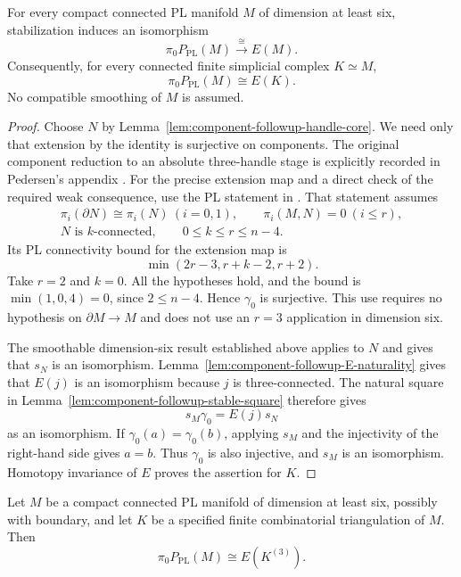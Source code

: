 \begin{theorem}\label{thm:component-followup-all-PL-six}
For every compact connected PL manifold $M$ of dimension at least six,
stabilization induces an isomorphism
\[
                      \pi_0P_{\mathrm{PL}}(M)\xrightarrow{\ \cong\ }E(M).
\]
Consequently, for every connected finite simplicial complex $K\simeq M$,
\[
                             \pi_0P_{\mathrm{PL}}(M)\cong E(K).
\]
No compatible smoothing of $M$ is assumed.
\end{theorem}

\begin{proof}
Choose $N$ by Lemma~\ref{lem:component-followup-handle-core}.
We need only that extension by the identity is surjective on
components.  The original component reduction to an absolute
three-handle stage is explicitly recorded in Pedersen's appendix
\cite[\S2, pp.~148--149]{Pedersen1975ComponentAppendix}.
For the precise extension map and a direct check of the required
weak consequence, use the PL statement in
\cite[Theorem~3.3 and the preceding paragraph,
p.~17]{GalvinNonino2025v1Component}.
That statement assumes
\[
 \begin{gathered}
 \pi_i(\partial N)\cong\pi_i(N)\ (i=0,1),\qquad
 \pi_i(M,N)=0\ (i\leq r),\\
 N\text{ is }k\text{-connected},\qquad 0\leq k\leq r\leq n-4.
 \end{gathered}
\]
Its PL connectivity bound for the extension map is
\[
                              \min(2r-3,r+k-2,r+2).
\]
Take $r=2$ and $k=0$.  All the hypotheses hold, and the bound is
$\min(1,0,4)=0$, since $2\leq n-4$.  Hence $\gamma_0$ is surjective.
This use requires no hypothesis on $\partial M\to M$ and does not use
an $r=3$ application in dimension six.

The smoothable dimension-six result established above applies to
$N$ and gives that $s_N$ is an isomorphism.
Lemma~\ref{lem:component-followup-E-naturality} gives that $E(j)$ is
an isomorphism because $j$ is three-connected.
The natural square in Lemma~\ref{lem:component-followup-stable-square}
therefore gives
\[
                              s_M\gamma_0=E(j)s_N
\]
as an isomorphism.  If $\gamma_0(a)=\gamma_0(b)$, applying $s_M$
and the injectivity of the right-hand side gives $a=b$.
Thus $\gamma_0$ is also injective, and $s_M$ is an isomorphism.
Homotopy invariance of $E$ proves the assertion for $K$.

\end{proof}

\begin{corollary}\label{cor:component-followup-chosen-three-skeleton}
Let $M$ be a compact connected PL manifold of dimension at least six,
possibly with boundary, and let $K$ be a specified finite
combinatorial triangulation of $M$.  Then
\[
                              \pi_0P_{\mathrm{PL}}(M)\cong E(K^{(3)}).
\]
\end{corollary}

